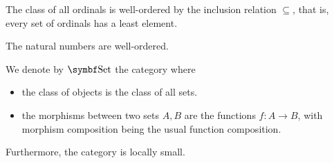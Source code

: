 \begin{theorem}\label{thm:ordinals_are_well_ordered}\cite[theorem 7M]{Enderton1977}
  The class of all ordinals is well-ordered by the inclusion relation \( \subseteq \), that is, every set of ordinals has a least element.
\end{theorem}

\begin{corollary}\label{thm:natural_numbers_are_well_ordered}
  The natural numbers are well-ordered.
\end{corollary}

\begin{definition}\label{def:category_of_sets}
  We denote by \( \Cat{Set} \) the category where
  \begin{itemize}
    \item the class of objects is the class of all sets.
    \item the morphisms between two sets \( A, B \) are the functions \( f: A \to B \), with morphism composition being the usual function composition.
  \end{itemize}

  Furthermore, the category is locally small.
\end{definition}
